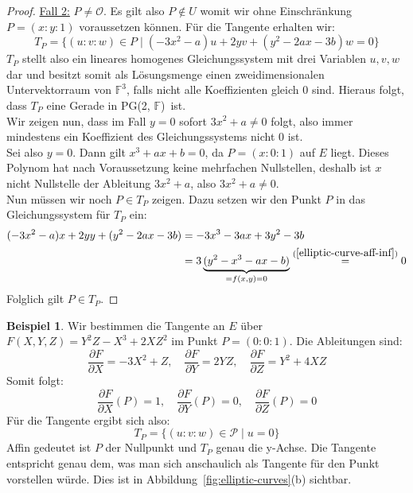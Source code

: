 \documentclass[hidelinks]{article}
\theoremstyle{plain}
\theoremstyle{definition}
\newtheorem{bsp}[thm]{Beispiel}
\theoremstyle{rem}
\newcommand{\pgtwo}{PG(2, $\mathbb{F}$)\ }
\newcommand{\patinf}{\mathcal{O}}
\begin{document}
\begin{sloppypar}
\begin{proof}
    \underline{Fall 2:} $P\ne\patinf$. Es gilt also $P\notin U$ womit wir ohne Einschränkung $P=(x:y:1)$ voraussetzen können. Für die Tangente erhalten wir:
    \begin{equation*}
        T_{P}=\{(u:v:w)\in P\mid (-3x^2-a)u+2yv+(y^2-2ax-3b)w=0\}
    \end{equation*}
    $T_P$ stellt also ein lineares homogenes Gleichungssystem mit drei Variablen $u,v,w$ dar und besitzt somit als Lösungsmenge einen zweidimensionalen Untervektorraum von $\mathbb{F}^3$, falls nicht alle Koeffizienten gleich 0 sind. Hieraus folgt, dass $T_P$ eine Gerade in \pgtwo ist.\\
    Wir zeigen nun, dass im Fall $y=0$ sofort $3x^2+a\ne0$ folgt, also immer mindestens ein Koeffizient des Gleichungssystems nicht 0 ist.\\
    Sei also $y=0$. Dann gilt $x^3+ax+b=0$, da $P=(x:0:1)$ auf $E$ liegt. Dieses Polynom hat nach Voraussetzung keine mehrfachen Nullstellen, deshalb ist $x$ nicht Nullstelle der Ableitung $3x^2+a$, also $3x^2+a\ne0$.\\
    Nun müssen wir noch $P\in T_P$ zeigen. Dazu setzen wir den Punkt $P$ in das Gleichungssystem für $T_P$ ein:
    \begin{align*}
        (-3x^2-a)x+2yy+(y^2-2ax-3b)&=-3x^3-3ax+3y^2-3b\\
        &=3\underbrace{(y^2-x^3-ax-b)}_{=f(x,y)=0}\stackrel{(\ref{elliptic-curve-aff-inf})}{=}0
    \end{align*}
    Folglich gilt $P\in T_P$.
\end{proof}
\begin{bsp}
    Wir bestimmen die Tangente an $E$ über $F(X,Y,Z)=Y^2Z-X^3+2XZ^2$ im Punkt \mbox{$P=(0:0:1)$}. Die Ableitungen sind:
    \begin{equation*}
        \frac{\partial F}{\partial X}=-3X^2+Z,\quad \frac{\partial F}{\partial Y}=2YZ,\quad \frac{\partial F}{\partial Z}=Y^2+4XZ
    \end{equation*}
    Somit folgt:
    \begin{equation*}
        \frac{\partial F}{\partial X}(P)=1,\quad \frac{\partial F}{\partial Y}(P)=0,\quad \frac{\partial F}{\partial Z}(P)=0
    \end{equation*}
    Für die Tangente ergibt sich also:
    \begin{equation*}
        T_P=\{(u:v:w)\in \mathcal{P}\mid u=0\}
    \end{equation*}
    Affin gedeutet ist $P$ der Nullpunkt und $T_P$ genau die y-Achse. Die Tangente entspricht genau dem, was man sich anschaulich als Tangente für den Punkt vorstellen würde. Dies ist in Abbildung~\ref{fig:elliptic-curves}(b) sichtbar.

\end{bsp}
\end{sloppypar}
\end{document}
